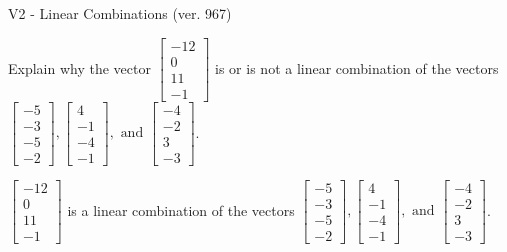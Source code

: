 \begin{exercise}
  \begin{exerciseTitle}V2 - Linear Combinations (ver. 967)\end{exerciseTitle}
  \begin{exerciseStatement}
    Explain why the vector \(\left[\begin{array}{c}
-12 \\
0 \\
11 \\
-1
\end{array}\right]\)  is or is not a linear 
	combination of the vectors \(\left[\begin{array}{c}
-5 \\
-3 \\
-5 \\
-2
\end{array}\right] , \left[\begin{array}{c}
4 \\
-1 \\
-4 \\
-1
\end{array}\right] , \text{ and } \left[\begin{array}{c}
-4 \\
-2 \\
3 \\
-3
\end{array}\right]\).
	


  \end{exerciseStatement}
  \begin{exerciseAnswer}
   \(\left[\begin{array}{c}
-12 \\
0 \\
11 \\
-1
\end{array}\right]\) 
  	 is  
	a linear combination of the vectors \(\left[\begin{array}{c}
-5 \\
-3 \\
-5 \\
-2
\end{array}\right] , \left[\begin{array}{c}
4 \\
-1 \\
-4 \\
-1
\end{array}\right] , \text{ and } \left[\begin{array}{c}
-4 \\
-2 \\
3 \\
-3
\end{array}\right]\).

	
  


  \end{exerciseAnswer}
\end{exercise}